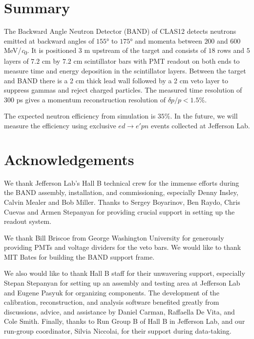 \documentclass[3p,twocolumn]{elsarticle}
\begin{document}
\section{Summary}
The Backward Angle Neutron Detector (BAND) of CLAS12 detects neutrons
  emitted at backward angles of $155$\si{\degree} to $175$\si{\degree}
  and momenta between $200$ and $600$ \si{\MeV/\clight}. It is
  positioned 3 \si{\meter} upstream of the target and consists of $18$
  rows and $5$ layers of $7.2$ \si{\centi\meter} by $7.2$
  \si{\centi\meter} scintillator bars with PMT readout on both ends to
  measure time and energy deposition in the scintillator
  layers. Between the target and BAND there is a 2 \si{\centi\meter}
  thick lead wall followed by a 2 \si{\centi\meter} veto layer to
  suppress gammas and reject charged particles. The measured time
  resolution of 300 ps gives a momentum
  reconstruction resolution of $\delta p/p < 1.5$\%.
 

The expected neutron efficiency from simulation is $35$\%. In the
future, we will measure the efficiency using exclusive $ed \rightarrow e'pn$
events collected at Jefferson Lab.


\section*{Acknowledgements}
We thank Jefferson Lab's Hall B technical crew for the immense efforts during the BAND assembly, installation, and commissioning, especially Denny Insley, Calvin Mealer and Bob Miller. Thanks to Sergey Boyarinov, Ben Raydo, Chris Cuevas and Armen Stepanyan for providing crucial support in setting up the readout system.

We thank Bill Briscoe from George Washington University for generously providing PMTs and voltage dividers for the veto bars. We would like to thank MIT Bates for building the BAND support frame. 

We also would like to thank Hall B staff for their unwavering support, especially Stepan Stepanyan for setting up an assembly and testing area at Jefferson Lab and Eugene Pasyuk for organizing components. The development of the calibration, reconstruction, and analysis software benefited greatly from discussions, advice, and assistance by Daniel Carman, Raffaella De Vita, and Cole Smith. Finally, thanks to Run Group B of Hall B in Jefferson Lab, and our run-group coordinator, Silvia Niccolai, for their support during data-taking.
\end{document}
